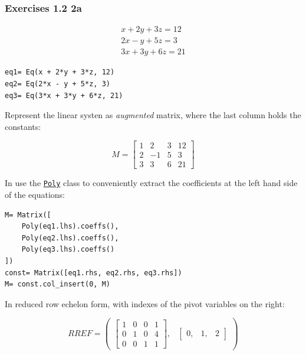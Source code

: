\subsubsection{Exercises 1.2 2a}

\begin{equation}\label{eq:na}
\begin{matrix}x + 2 y + 3 z = 12\\2 x - y + 5 z = 3\\3 x + 3 y + 6 z = 21\end{matrix}
\end{equation}

\begin{verbatim}
eq1= Eq(x + 2*y + 3*z, 12)
eq2= Eq(2*x - y + 5*z, 3)
eq3= Eq(3*x + 3*y + 6*z, 21)
\end{verbatim}

Represent the linear systen as \textit{augmented} matrix, where the last column
holds the constants:

\begin{equation}\label{eq:na}
M= \left[\begin{matrix}1 & 2 & 3 & \textit{12}\\
                       2 & -1 & 5 & \textit{3}\\
                       3 & 3 & 6 & \textit{21}\end{matrix}\right]
\end{equation}

In \sympy use the \href{http://docs.sympy.org/latest/modules/polys/reference.html#sympy.polys.polytools.Poly}{\texttt{Poly}}
class to conveniently extract the coefficients at the left hand side of
the equations:

\begin{verbatim}
M= Matrix([
    Poly(eq1.lhs).coeffs(),
    Poly(eq2.lhs).coeffs(),
    Poly(eq3.lhs).coeffs()
])
const= Matrix([eq1.rhs, eq2.rhs, eq3.rhs])
M= const.col_insert(0, M)
\end{verbatim}

In reduced row echelon form, with indexes of the pivot variables on the right:

\begin{equation}\label{eq:na}
RREF= \begin{pmatrix}\left[\begin{matrix}1 & 0 & 0 & 1\\0 & 1 & 0 & 4\\0 & 0 & 1 & 1\end{matrix}\right], & \begin{bmatrix}0, & 1, & 2\end{bmatrix}\end{pmatrix}
\end{equation}

